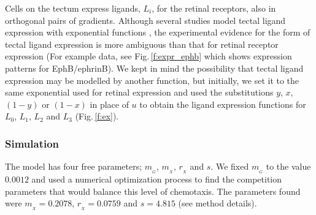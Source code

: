 \documentclass[9pt]{elife} %
\begin{document}
%

Cells on the tectum express ligands, $L_i$, for the retinal receptors, also in orthogonal pairs of gradients.
Although several studies model tectal ligand expression with exponential functions \citep{koulakov_stochastic_2004}, the experimental evidence for the form of tectal ligand expression is more ambiguous than that for retinal receptor expression (For example data, see Fig.\,\ref{f:expr_ephb} which shows expression patterns for EphB/ephrinB).
We kept in mind the possibility that tectal ligand expression may be modelled by another function, but initially, we set it to the same exponential used for retinal expression and used the substitutions $y$, $x$, $(1-y)$ or $(1-x)$ in place of $u$ to obtain the ligand expression functions for $L_0$, $L_1$, $L_2$ and $L_3$ (Fig.\,\ref{f:ex}).


\subsubsection*{Simulation}

The model has four free parameters; $m_{\!_G}$, $m_{\!_X}$, $r_{\!_X}$ and $s$. We fixed $m_{\!_G}$ to the value $0.0012$ and used a numerical optimization process to find the competition parameters that would balance this level of chemotaxis. The parameters found were $m_{\!_X} = 0.2078$, $r_{\!_X} = 0.0759$ and $s = 4.815$ (see method details).
\end{document}
